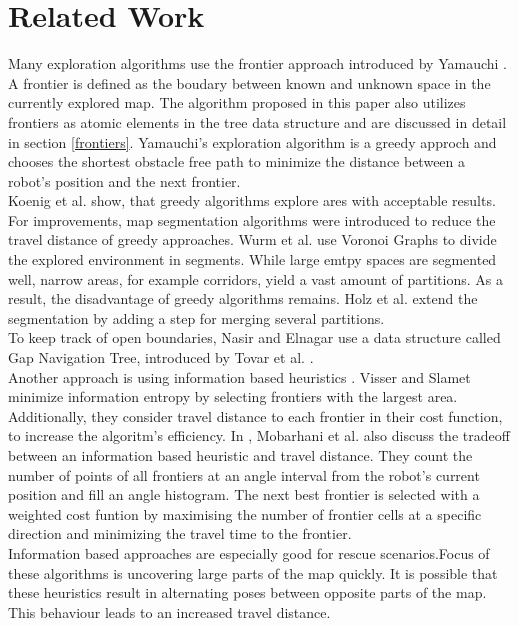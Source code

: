 \documentclass[twocolumn]{svjour3}[2016]
\begin{document}
\section{Related Work}
\label{related_work}
Many exploration algorithms use the frontier approach introduced by Yamauchi \cite{brian_yamauchi_frontier-based_2007}. A frontier is defined as the boudary between known and unknown space in the currently explored map. The algorithm proposed in this paper also utilizes frontiers as atomic elements in the tree data structure and are discussed in detail in section \ref{frontiers}. Yamauchi's exploration algorithm is a greedy approch and chooses the shortest obstacle free path to minimize the distance between a robot's position and the next frontier.\\
Koenig et al. \cite{sven_koenig_greedy_2001} show, that greedy algorithms explore ares with acceptable results. For improvements, map segmentation algorithms were introduced \cite{dirk_holz_evaluating_2010, kai_m._wurm_coordinated_2008} to reduce the travel distance of greedy approaches. Wurm et al. \cite{kai_m._wurm_coordinated_2008} use Voronoi Graphs to divide the explored environment in segments. While large emtpy spaces are segmented well, narrow areas, for example corridors, yield a vast amount of partitions. As a result, the disadvantage of greedy algorithms remains. Holz et al. \cite{dirk_holz_evaluating_2010} extend the segmentation by adding a step for merging several partitions.\\
To keep track of open boundaries, Nasir and Elnagar \cite{reem_nasir_gap_2015} use a data structure called Gap Navigation Tree, introduced by Tovar et al. \cite{benjamin_tovar_optimal_2003}.\\
Another approach is using information based heuristics \cite{arnoud_visser_balancing_2008,amir_mobarhani_histogram_2011,robert_grabowski_autonomous_2003}. Visser and Slamet \cite{arnoud_visser_balancing_2008} minimize information entropy by selecting frontiers with the largest area. Additionally, they consider travel distance to each frontier in their cost function, to increase the algoritm's efficiency. In \cite{amir_mobarhani_histogram_2011}, Mobarhani et al. also discuss the tradeoff between an information based heuristic and travel distance. They count the number of points of all frontiers at an angle interval from the robot's current position and fill an angle histogram. The next best frontier is selected with a weighted cost funtion by maximising the number of frontier cells at a specific direction and minimizing the travel time to the frontier.\\
Information based approaches are especially good for rescue scenarios.Focus of these algorithms is uncovering large parts of the map quickly. It is possible that these heuristics result in alternating poses between opposite parts of the map. This behaviour leads to an increased travel distance.\\
\end{document}
